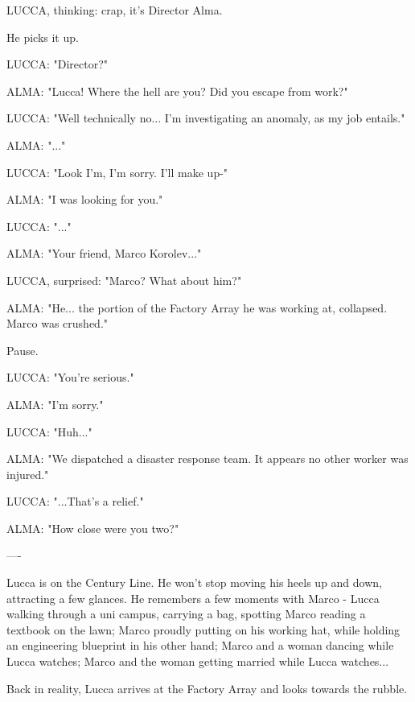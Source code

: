 \documentclass[11pt]{article}
\begin{document}
LUCCA, thinking: crap, it's Director Alma.

He picks it up.

LUCCA: "Director?"

ALMA: "Lucca! Where the hell are you? Did you escape from work?"

LUCCA: "Well technically no... I'm investigating an anomaly, as my job entails."

ALMA: "..."

LUCCA: "Look I'm, I'm sorry. I'll make up-"

ALMA: "I was looking for you."

LUCCA: "..."

ALMA: "Your friend, Marco Korolev..."

LUCCA, surprised: "Marco? What about him?"

ALMA: "He... the portion of the Factory Array he was working at, collapsed. Marco was crushed."

Pause.

LUCCA: "You're serious."

ALMA: "I'm sorry."

LUCCA: "Huh..."

ALMA: "We dispatched a disaster response team. It appears no other worker was injured."

LUCCA: "...That's a relief."

ALMA: "How close were you two?"

----

Lucca is on the Century Line. He won't stop moving his heels up and down, attracting a few glances. He remembers a few moments with Marco - Lucca walking through a uni campus, carrying a bag, spotting Marco reading a textbook on the lawn; Marco proudly putting on his working hat, while holding an engineering blueprint in his other hand; Marco and a woman dancing while Lucca watches; Marco and the woman getting married while Lucca watches...

Back in reality, Lucca arrives at the Factory Array and looks towards the rubble.
\end{document}
